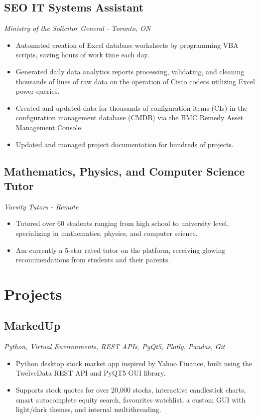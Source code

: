 \documentclass[10pt, a4paper]{article}
\begin{document}
\subsection*{SEO IT Systems Assistant \hfill {}}
\textit{Ministry of the Solicitor General - Toronto, ON}
\begin{itemize}
    \item Automated creation of Excel database worksheets by programming VBA scripts, saving hours of work time each day.
    \item Generated daily data analytics reports processing, validating, and cleaning thousands of lines of raw data on the operation of Cisco codecs utilizing Excel power queries.
    \item Created and updated data for thousands of configuration items (CIs) in the configuration management database (CMDB) via the BMC Remedy Asset Management Console.
    \item Updated and managed project documentation for hundreds of projects.
\end{itemize}

\subsection*{Mathematics, Physics, and Computer Science Tutor \hfill {}}
\textit{Varsity Tutors - Remote}
\begin{itemize}
    \item Tutored over 60 students ranging from high school to university level, specializing in mathematics, physics, and computer science.
    \item Am currently a 5-star rated tutor on the platform, receiving glowing recommendations from students and their parents.
\end{itemize}

\section*{Projects}

\subsection*{MarkedUp }
\vspace*{2pt}
\textit{Python, Virtual Environments, REST APIs, PyQt5, Plotly, Pandas, Git}
\begin{itemize}
    \item Python desktop stock market app inspired by Yahoo Finance, built using the TwelveData REST API and PyQT5 GUI library.
    \item Supports stock quotes for over 20,000 stocks, interactive candlestick charts, smart autocomplete equity search, favourites watchlist, a custom GUI with light/dark themes, and internal multithreading.
\end{itemize}
\end{document}
